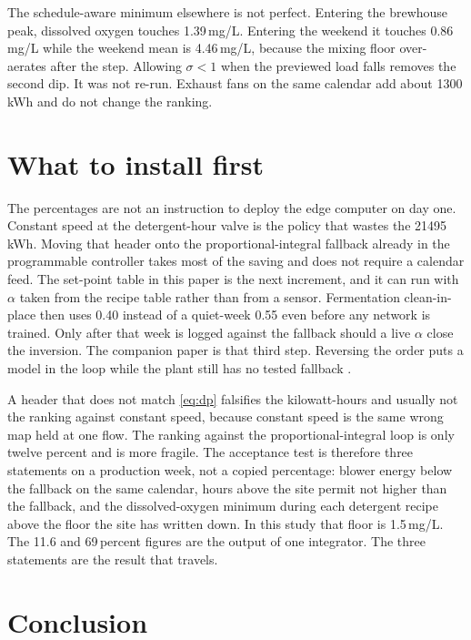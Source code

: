 \documentclass[11pt,a4paper]{article}
\begin{document}
The schedule-aware minimum elsewhere is not perfect. Entering the brewhouse peak, dissolved oxygen touches 1.39\,mg/L. Entering the weekend it touches 0.86\,mg/L while the weekend mean is 4.46\,mg/L, because the mixing floor over-aerates after the step. Allowing \(\sigma<1\) when the previewed load falls removes the second dip. It was not re-run. Exhaust fans on the same calendar add about 1300\,kWh and do not change the ranking.

\section{What to install first}

The percentages are not an instruction to deploy the edge computer on day one. Constant speed at the detergent-hour valve is the policy that wastes the 21495\,kWh. Moving that header onto the proportional-integral fallback already in the programmable controller takes most of the saving and does not require a calendar feed. The set-point table in this paper is the next increment, and it can run with \(\alpha\) taken from the recipe table rather than from a sensor. Fermentation clean-in-place then uses 0.40 instead of a quiet-week 0.55 even before any network is trained. Only after that week is logged against the fallback should a live \(\alpha\) close the inversion. The companion paper is that third step. Reversing the order puts a model in the loop while the plant still has no tested fallback \cite{obrien2011}.

A header that does not match \eqref{eq:dp} falsifies the kilowatt-hours and usually not the ranking against constant speed, because constant speed is the same wrong map held at one flow. The ranking against the proportional-integral loop is only twelve percent and is more fragile. The acceptance test is therefore three statements on a production week, not a copied percentage: blower energy below the fallback on the same calendar, hours above the site permit not higher than the fallback, and the dissolved-oxygen minimum during each detergent recipe above the floor the site has written down. In this study that floor is 1.5\,mg/L. The 11.6 and 69\,percent figures are the output of one integrator. The three statements are the result that travels.

\section{Conclusion}
\end{document}
